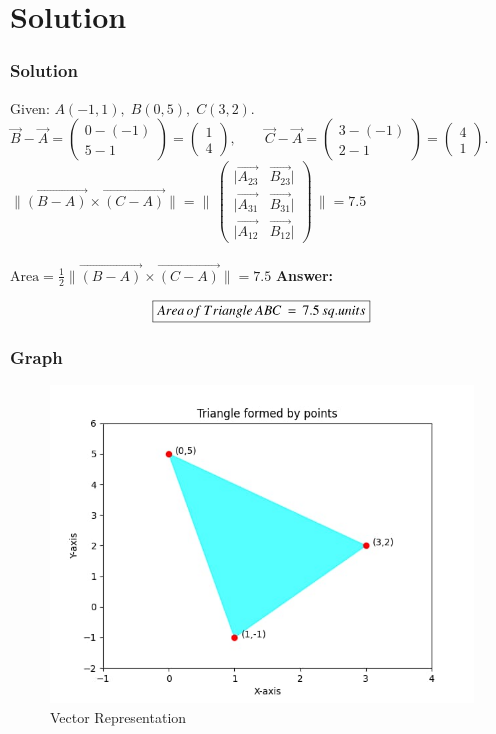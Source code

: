 \documentclass{beamer}
\theoremstyle{remark}
\providecommand{\norm}[1]{\lVert#1\rVert}
\newcommand{\myvec}[1]{\ensuremath{\begin{pmatrix}#1\end{pmatrix}}}
\numberwithin{equation}{section}
\begin{document}
\section{Solution}
\begin{frame}[fragile]
    \frametitle{Solution}
Given: $A(-1,1),\; B(0,5),\; C(3,2).$\\

$
\vec{B}-\vec{A}=\myvec{0-(-1)\\5-1}
=\myvec{1\\4},\qquad
\vec{C}-\vec{A}=\myvec{3-(-1)\\2-1} = \myvec{4\\1}.
$\\

$\norm{\vec{(B-A)} \times \vec{(C-A)}} = \norm{\,\myvec{|\vec{A_{23}} & \vec{B_{23}}| \\ |\vec{A_{31}} & \vec{B_{31}}| \\ |\vec{A_{12}} & \vec{B_{12}}|}\,} = 7.5 $\\\\


$
\text{Area}=\frac{1}{2}\norm{\vec{(B-A)} \times \vec{(C-A)}} = 7.5
$
\textbf{Answer:}


\begin{align}
    \centering
    \boxed{Area \, of \, Triangle \, ABC \,= \,7.5\,sq.units}
\end{align}

\end{frame}
\begin{frame}
    \frametitle{Graph}
    \begin{figure}[htbp]
    \centering
    \includegraphics[width=0.65\linewidth]{FIG/fig1.png}
    \caption{Vector Representation}
    \label{fig:FIG/fig1.png}
\end{figure}
\end{frame}
\end{document}
